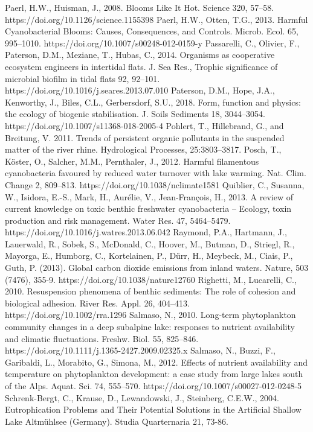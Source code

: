 \begin{thebibliography}{}
Paerl, H.W., Huisman, J., 2008. Blooms Like It Hot. Science 320, 57–58. https://doi.org/10.1126/science.1155398
Paerl, H.W., Otten, T.G., 2013. Harmful Cyanobacterial Blooms: Causes, Consequences, and Controls. Microb. Ecol. 65, 995–1010. https://doi.org/10.1007/s00248-012-0159-y
Passarelli, C., Olivier, F., Paterson, D.M., Meziane, T., Hubas, C., 2014. Organisms as cooperative ecosystem engineers in intertidal flats. J. Sea Res., Trophic significance of microbial biofilm in tidal flats 92, 92–101. https://doi.org/10.1016/j.seares.2013.07.010
Paterson, D.M., Hope, J.A., Kenworthy, J., Biles, C.L., Gerbersdorf, S.U., 2018. Form, function and physics: the ecology of biogenic stabilisation. J. Soils Sediments 18, 3044–3054. https://doi.org/10.1007/s11368-018-2005-4
Pohlert, T., Hillebrand, G., and Breitung, V. 2011. Trends of persistent organic pollutants in the suspended matter of the river rhine. Hydrological Processes, 25:3803–3817.
Posch, T., Köster, O., Salcher, M.M., Pernthaler, J., 2012. Harmful filamentous cyanobacteria favoured by reduced water turnover with lake warming. Nat. Clim. Change 2, 809–813. https://doi.org/10.1038/nclimate1581
Quiblier, C., Susanna, W., Isidora, E.-S., Mark, H., Aurélie, V., Jean-François, H., 2013. A review of current knowledge on toxic benthic freshwater cyanobacteria – Ecology, toxin production and risk management. Water Res. 47, 5464–5479. https://doi.org/10.1016/j.watres.2013.06.042
Raymond, P.A., Hartmann, J., Lauerwald, R., Sobek, S., McDonald, C., Hoover, M., Butman, D., Striegl, R., Mayorga, E., Humborg, C., Kortelainen, P., Dürr, H., Meybeck, M., Ciais, P., Guth, P. (2013). Global carbon dioxide emissions from inland waters. Nature, 503 (7476), 355-9. https://doi.org/10.1038/nature12760
Righetti, M., Lucarelli, C., 2010. Resuspension phenomena of benthic sediments: The role of cohesion and biological adhesion. River Res. Appl. 26, 404–413. https://doi.org/10.1002/rra.1296
Salmaso, N., 2010. Long-term phytoplankton community changes in a deep subalpine lake: responses to nutrient availability and climatic fluctuations. Freshw. Biol. 55, 825–846. https://doi.org/10.1111/j.1365-2427.2009.02325.x
Salmaso, N., Buzzi, F., Garibaldi, L., Morabito, G., Simona, M., 2012. Effects of nutrient availability and temperature on phytoplankton development: a case study from large lakes south of the Alps. Aquat. Sci. 74, 555–570. https://doi.org/10.1007/s00027-012-0248-5
Schrenk-Bergt, C., Krause, D., Lewandowski, J., Steinberg, C.E.W., 2004. Eutrophication Problems and Their Potential Solutions in the Artificial Shallow Lake Altmühlsee (Germany). Studia Quarternaria 21, 73-86.

\end{thebibliography}
